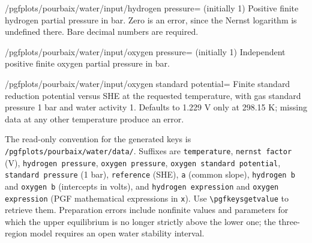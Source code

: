 \documentclass[a4paper,11pt]{ltxdoc}
\begin{document}
\begin{key}{/pgfplots/pourbaix/water/input/hydrogen pressure= (initially 1)}
Positive finite hydrogen partial pressure in bar. Zero is an error, since the
Nernst logarithm is undefined there. Bare decimal numbers are required.
\end{key}
\begin{key}{/pgfplots/pourbaix/water/input/oxygen pressure= (initially 1)}
Independent positive finite oxygen partial pressure in bar.
\end{key}
\begin{key}{/pgfplots/pourbaix/water/input/oxygen standard potential=}
Finite standard reduction potential versus SHE at the requested temperature,
with gas standard pressure 1 bar and water activity 1. Defaults to 1.229 V only
at 298.15 K; missing data at any other temperature produce an error.
\end{key}

The read-only convention for the generated keys is
\texttt{/pgfplots/pourbaix/water/data/}. Suffixes are \texttt{temperature}, \texttt{nernst factor} (V),
\texttt{hydrogen pressure}, \texttt{oxygen pressure},
\texttt{oxygen standard potential}, \texttt{standard pressure} (1 bar),
\texttt{reference} (SHE), \texttt{a} (common slope), \texttt{hydrogen b} and
\texttt{oxygen b} (intercepts in volts), and \texttt{hydrogen expression} and
\texttt{oxygen expression} (PGF mathematical expressions in \texttt{x}).
Use \verb|\pgfkeysgetvalue| to retrieve them. Preparation errors include
nonfinite values and parameters for which the upper equilibrium is no longer
strictly above the lower one; the three-region model requires an open water
stability interval.
\end{document}
